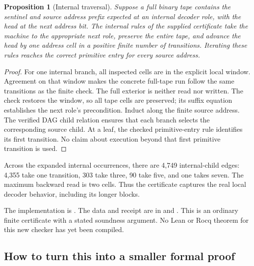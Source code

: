 \documentclass[11pt,a4paper]{article}
\newtheorem{proposition}{Proposition}[section]
\begin{document}
\begin{proposition}[Internal traversal]
Suppose a full binary tape contains the sentinel and source address
prefix expected at an internal decoder role, with the head at the next
address bit. The internal rules of the supplied certificate take the
machine to the appropriate next role, preserve the entire tape, and
advance the head by one address cell in a positive finite number of
transitions. Iterating these rules reaches the correct primitive entry
for every source address.
\end{proposition}

\begin{proof}
For one internal branch, all inspected cells are in the explicit local
window. Agreement on that window makes the concrete full-tape run follow
the same transitions as the finite check. The full exterior is neither
read nor written. The check restores the window, so all tape cells are
preserved; its suffix equation establishes the next role's precondition.
Induct along the finite source address. The verified DAG child relation
ensures that each branch selects the corresponding source child. At a
leaf, the checked primitive-entry rule identifies its first transition.
No claim about execution beyond that first primitive transition is used.
\end{proof}

Across the expanded internal occurrences, there are 4,749 internal-child
edges: 4,355 take one transition, 303 take three, 90 take five, and one
takes seven. The maximum backward read is two cells. Thus the certificate
captures the real local decoder behavior, including its longer blocks.

The implementation is . The data and
receipt are in  and
. This is an ordinary finite
certificate with a stated soundness argument. No Lean or Rocq theorem
for this new checker has yet been compiled.

\subsection{How to turn this into a smaller formal proof}
\end{document}
